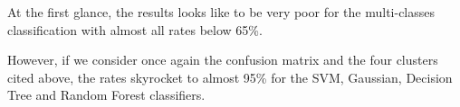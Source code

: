             
            \medskip
            
            At the first glance, the results looks like to be very poor for the multi-classes classification with almost all 
            rates below 65\%. 
            
            \medskip
            
            However, if we consider once again the confusion matrix and the four clusters cited above, the rates skyrocket to almost 
            95\% for the SVM, Gaussian, Decision Tree and Random Forest classifiers.

            
